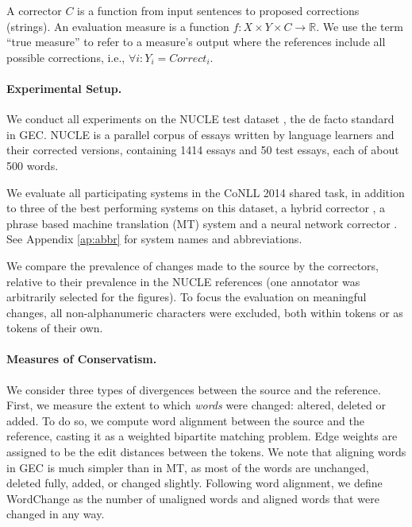\documentclass[letterpaper, 11pt]{article}
\newcommand{\lc}[1]{\footnote{\color{blue}LC: #1}}
\begin{document}
A corrector $C$ is a function from input sentences to proposed corrections (strings).
An evaluation measure is a function $f\colon X \times Y \times C\to \mathbb{R}$. We use the term ``true measure'' to refer to a measure's output where the references include all possible corrections, 
i.e., $\forall i\colon Y_i=Correct_i$.

\paragraph{Experimental Setup.}\label{par:experimental_setup}
We conduct all experiments on the NUCLE test dataset \cite{dahlmeier2013building},
the de facto standard in GEC.
NUCLE is a parallel corpus of essays written by language learners and their corrected versions,
containing 1414 essays and 50 test essays, each of about 500 words.

We evaluate all participating systems in the CoNLL 2014 shared task,
in addition to three of the best performing systems on this dataset,
a hybrid corrector \cite{rozovskaya2016grammatical}, a phrase based machine translation (MT) system \cite{junczysdowmunt-grundkiewicz:2016:EMNLP2016} 
and a neural network corrector \cite{xie2016neural}.
See Appendix \ref{ap:abbr} for system names and abbreviations. 

We compare the prevalence of changes made to the source by the correctors,
relative to their prevalence in the NUCLE references (one annotator was arbitrarily 
selected for the figures). 
To focus the evaluation on meaningful changes, all non-alphanumeric characters were 
excluded, both within tokens or as tokens of their own.

\paragraph{Measures of Conservatism.}
We consider three types of divergences between the source and the reference.
First, we measure the extent to which \emph{words} were changed: altered, deleted or added.
To do so, we compute word alignment between the source and the reference, casting it
as a weighted bipartite matching problem. Edge weights are assigned to be the edit distances between the tokens.
We note that aligning words in GEC is much simpler than in MT,
as most of the words are unchanged, deleted fully, added, or changed slightly.
Following word alignment, we define {\sc WordChange}
as the number of unaligned words and aligned words that were changed in any way.
\end{document}
